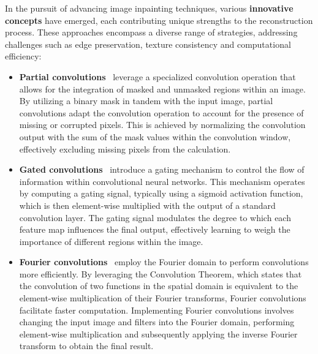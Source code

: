 In the pursuit of advancing image inpainting techniques, various \textbf{innovative concepts} have emerged, each contributing unique strengths to the reconstruction process. These approaches encompass a diverse range of strategies, addressing challenges such as edge preservation, texture consistency and computational efficiency:
\begin{itemize}[leftmargin=1.5em]
    \setlength\itemsep{0.2cm}

    \item \textbf{Partial convolutions}~\supercite{partial-conv} leverage a specialized convolution operation that allows for the integration of masked and unmasked regions within an image. By utilizing a binary mask in tandem with the input image, partial convolutions adapt the convolution operation to account for the presence of missing or corrupted pixels. This is achieved by normalizing the convolution output with the sum of the mask values within the convolution window, effectively excluding missing pixels from the calculation.

    \item \textbf{Gated convolutions}~\supercite{free-form-inpainting} introduce a gating mechanism to control the flow of information within convolutional neural networks. This mechanism operates by computing a gating signal, typically using a sigmoid activation function, which is then element-wise multiplied with the output of a standard convolution layer. The gating signal modulates the degree to which each feature map influences the final output, effectively learning to weigh the importance of different regions within the image.

    \item \textbf{Fourier convolutions}~\supercite{fourier-conv} employ the Fourier domain to perform convolutions more efficiently. By leveraging the Convolution Theorem, which states that the convolution of two functions in the spatial domain is equivalent to the element-wise multiplication of their Fourier transforms, Fourier convolutions facilitate faster computation. Implementing Fourier convolutions involves changing the input image and filters into the Fourier domain, performing element-wise multiplication and subsequently applying the inverse Fourier transform to obtain the final result.


\end{itemize}
